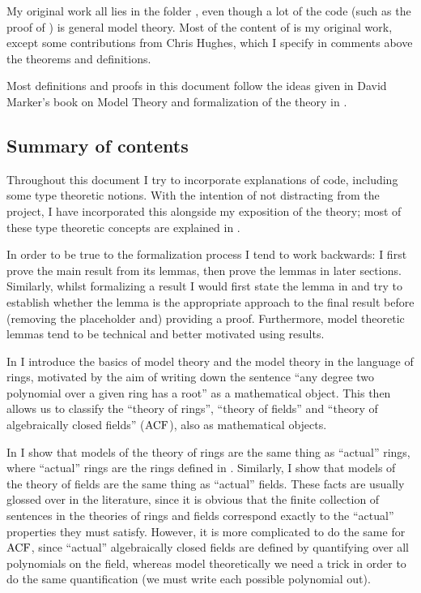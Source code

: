 My original work all lies in the folder ,
even though a lot of the code (such as the proof of )
is general model theory.
Most of the content of  is my original work,
except some contributions from Chris Hughes,
which I specify in comments above the theorems and definitions.

Most definitions and proofs in this document follow the ideas given in
David Marker's book on Model Theory \cite{marker}
and formalization of the theory in .

\subsection*{Summary of contents}

Throughout this document I try to incorporate explanations of  code,
including some type theoretic notions.
With the intention of not distracting from the project,
I have incorporated this alongside my exposition of the theory;
most of these type theoretic concepts are explained in
.

In order to be true to the formalization process
I tend to work backwards:
I first prove the main result from its lemmas,
then prove the lemmas in later sections.
Similarly, whilst formalizing a result I would first state the lemma in 
and try to establish whether the lemma is the appropriate approach
to the final result before (removing the placeholder  and) providing a proof.
Furthermore, model theoretic lemmas tend to be technical and better motivated using results.

In  I introduce the basics of model theory and
the model theory in the language of rings,
motivated by the aim of writing down the sentence
``any degree two polynomial over a given ring has a root'' as a mathematical object.
This then allows us to classify the ``theory of rings'', ``theory of fields'' and
``theory of algebraically closed fields'' ($\operatorname{ACF}$), also as mathematical objects.

In 
I show that models of the theory of rings are the same thing
as ``actual'' rings, where ``actual'' rings are the rings defined in .
Similarly, I show that models of the theory of fields are the same thing as ``actual'' fields.
These facts are usually glossed over in the literature,
since it is obvious that the finite collection of sentences in the theories of
rings and fields correspond exactly to the ``actual'' properties they must satisfy.
However, it is more complicated to do the same for $\operatorname{ACF}$,
since ``actual'' algebraically closed fields are defined by
quantifying over all polynomials on the field,
whereas model theoretically we need a trick in order to
do the same quantification (we must write each possible polynomial out).

